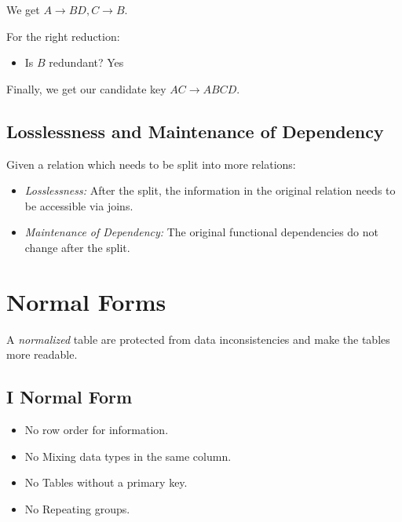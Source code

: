 We get \(A \to BD, C \to B\).

For the right reduction: 

\begin{itemize}

    \item Is \(B\) redundant? Yes

\end{itemize}

Finally, we get our candidate key \(AC \to ABCD\).

\subsection{Losslessness and Maintenance of Dependency}

Given a relation which needs to be split into more relations:

\begin{itemize}

    \item \emph{Losslessness:} After the split, the information in the original relation needs to be accessible via joins.

    \item \emph{Maintenance of Dependency:} The original functional dependencies do not change after the split.

\end{itemize}

\section{Normal Forms}

A \emph{normalized} table are protected from data inconsistencies and make the tables more readable.

\subsection{I Normal Form}

\begin{itemize}
    
    \item No row order for information.
    
    \item No Mixing data types in the same column.
    
    \item No Tables without a primary key.
    
    \item No Repeating groups.

\end{itemize}

